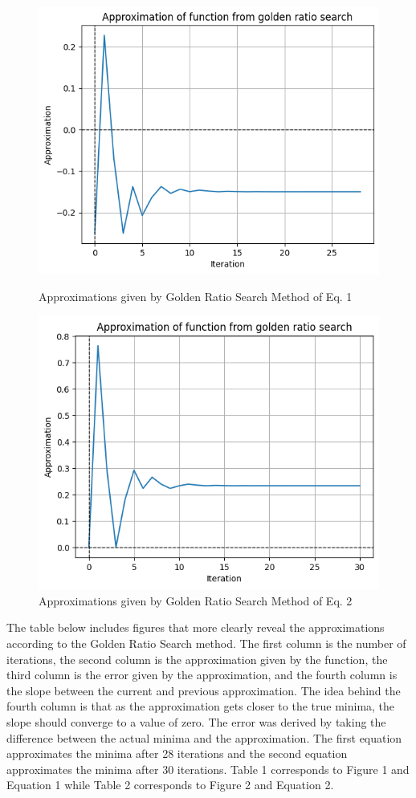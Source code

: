 \documentclass[linenumbers,RNAAS,trackchanges]{aastex631}
\begin{document}
\begin{figure}[H]
    \centering
    \includegraphics[scale=.75]{modelr54.png}
    \caption{Approximations given by Golden Ratio Search Method of Eq. 1}
    \label{fig:asa}
    \centering
    \includegraphics[scale=.75]{model8p.png}
    \caption{Approximations given by Golden Ratio Search Method of Eq. 2}
    \label{fig:code}
\end{figure}

The table below includes figures that more clearly reveal the approximations according to the Golden Ratio Search method. The first column is the number of iterations, the second column is the approximation given by the function, the third column is the error given by the approximation, and the fourth column is the slope between the current and previous approximation. The idea behind the fourth column is that as the approximation gets closer to the true minima, the slope should converge to a value of zero. The error was derived by taking the difference between the actual minima and the approximation. The first equation approximates the minima after 28 iterations and the second equation approximates the minima after 30 iterations. Table 1 corresponds to Figure 1 and Equation 1 while Table 2 corresponds to Figure 2 and Equation 2. 
\end{document}
